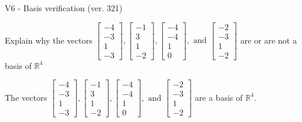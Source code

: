 \begin{exercise}
  \begin{exerciseTitle}V6 - Basis verification (ver. 321)\end{exerciseTitle}
  \begin{exerciseStatement}
    Explain why the vectors \(\left[\begin{array}{r}
-4 \\
-3 \\
1 \\
-3
\end{array}\right] , \left[\begin{array}{r}
-1 \\
3 \\
1 \\
-2
\end{array}\right] , \left[\begin{array}{r}
-4 \\
-4 \\
1 \\
0
\end{array}\right] , \text{ and } \left[\begin{array}{r}
-2 \\
-3 \\
1 \\
-2
\end{array}\right]\) are or are not a basis of \(\mathbb{R}^4\)	


  \end{exerciseStatement}
  \begin{exerciseAnswer}
   The vectors \(\left[\begin{array}{r}
-4 \\
-3 \\
1 \\
-3
\end{array}\right] , \left[\begin{array}{r}
-1 \\
3 \\
1 \\
-2
\end{array}\right] , \left[\begin{array}{r}
-4 \\
-4 \\
1 \\
0
\end{array}\right] , \text{ and } \left[\begin{array}{r}
-2 \\
-3 \\
1 \\
-2
\end{array}\right]\) 
  	 are  a basis of \(\mathbb{R}^4\).
  


  \end{exerciseAnswer}
\end{exercise}